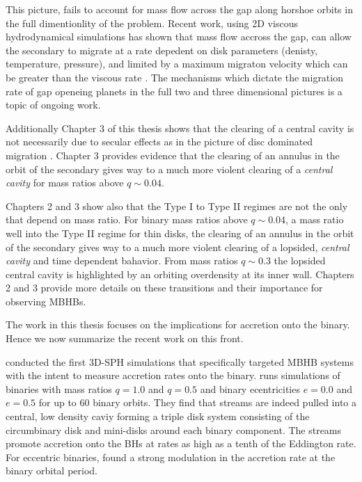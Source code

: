 This picture, fails to account for mass flow across the gap along
horshoe orbits in the full dimentionlity of the problem. Recent work, using 2D
viscous hydrodynamical simulations has shown that mass flow accross the gap,
can allow the secondary to migrate at a rate depedent on disk parameters
(denisty, temperature, pressure), and limited by a maximum migraton velocity
which can be greater than the viscous rate \citep{Edgar:2008, DuffelFTV,
DurmannKley:2012}. The mechanisms which dictate the migration rate of gap
openeing planets in the full two and three dimensional pictures is a topic of
ongoing work.


Additionally Chapter 3 of this thesis shows that the clearing of a central
cavity is not necessarily due to secular effects as in the picture of disc
dominated migration \cite{SyerClarke:1995}. Chapter 3 provides evidence that
the clearing of an annulus in the orbit of the secondary gives way to a much
more violent clearing of a \emph{central cavity} for mass ratios above $q
\sim0.04$.

Chapters 2 and 3 show also that the Type I to Type II regimes are not the only
that depend on mass ratio. For binary mass ratios above $q\sim0.04$, a mass
ratio well into the Type II regime for thin disks, the clearing of an annulus
in the orbit of the secondary gives way to a much more violent clearing of a
lopsided, \emph{central cavity} and time dependent bahavior. From mass ratios
$q \sim 0.3$ the lopsided central cavity is highlighted by an orbiting
overdensity at its inner wall. Chapters 2 and 3 provide more details on these
transitions and their importance for observing MBHBs.




The work in this thesis focuses on the implications for accretion onto the binary. Hence we now summarize the recent work on this front.


\cite{Haysaki:2007} conducted the first 3D-SPH simulations that specifically
targeted MBHB systems with the intent to measure accretion rates onto the
binary. \cite{Haysaki:2007} runs simulations of binaries with mass ratios
$q=1.0$ and $q=0.5$ and binary ecentricities $e=0.0$ and $e=0.5$ for up to 60
binary orbits. They find that streams are indeed pulled into a central, low
density caviy forming a triple disk system \citep{Hayasaki:2008} consisting of
the circumbinary disk and mini-disks around each binary component. The streams
promote accretion onto the BHs at rates as high as a tenth of the Eddington
rate. For eccentric binaries, \cite{Haysaki:2007} found a strong modulation in
the accretion rate at the binary orbital period. 

